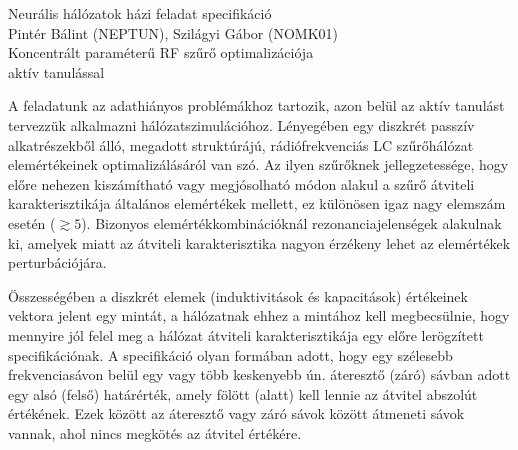 \documentclass[12pt,a4paper,oneside]{report}
\begin{document}
\begin{center}
	\huge{Neurális hálózatok házi feladat specifikáció} \\
	\vspace*{0.5cm}
	\large{Pintér Bálint (NEPTUN), Szilágyi Gábor (NOMK01)}\\
	\vspace*{0.5cm}
	\Large{Koncentrált paraméterű RF szűrő optimalizációja \\ aktív tanulással}
\end{center}
A feladatunk az adathiányos problémákhoz tartozik, azon belül az aktív tanulást tervezzük alkalmazni hálózatszimulációhoz. Lényegében egy diszkrét passzív alkatrészekből álló, megadott struktúrájú, rádiófrekvenciás LC szűrőhálózat elemértékeinek optimalizálásáról van szó. Az ilyen szűrőknek jellegzetessége, hogy előre nehezen kiszámítható vagy megjósolható módon alakul a szűrő átviteli karakterisztikája általános elemértékek mellett, ez különösen igaz nagy elemszám esetén ($\gtrsim5$). Bizonyos elemértékkombinációknál rezonanciajelenségek alakulnak ki, amelyek miatt az átviteli karakterisztika nagyon érzékeny lehet az elemértékek perturbációjára. 

Összességében a diszkrét elemek (induktivitások és kapacitások) értékeinek vektora jelent egy mintát, a hálózatnak ehhez a mintához kell megbecsülnie, hogy mennyire jól felel meg a hálózat átviteli karakterisztikája egy előre lerögzített specifikációnak. A specifikáció olyan formában adott, hogy egy szélesebb frekvenciasávon belül egy vagy több keskenyebb ún. áteresztő (záró) sávban adott egy alsó (felső) határérték, amely fölött (alatt) kell lennie az átvitel abszolút értékének. Ezek között az áteresztő vagy záró sávok között átmeneti sávok vannak, ahol nincs megkötés az átvitel értékére.
\end{document}
